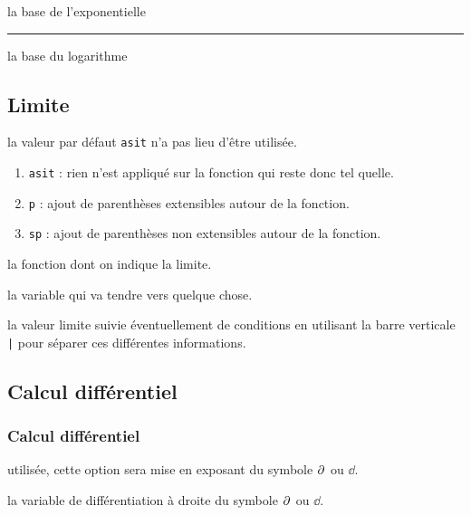 \documentclass[12pt,a4paper]{article}
\theoremstyle{definition}
\newcommand\separation{
	\medskip
	\hfill\rule{0.5\textwidth}{0.75pt}\hfill
	\medskip
}
\begin{document}
\IDarg{} la base de l'exponentielle

\separation


\IDarg{} la base du logarithme



\subsection{Limite}



\IDoption{}  la valeur par défaut \verb+asit+ n'a pas lieu d'être utilisée. 
\begin{enumerate}
	\item \verb+asit+ : rien n'est appliqué sur la fonction qui reste donc tel quelle.
	
	\item \verb+p+ : ajout de parenthèses extensibles autour de la fonction.

	\item \verb+sp+ : ajout de parenthèses non extensibles autour de la fonction.
\end{enumerate}


 la fonction dont on indique la limite.

 la variable qui va tendre vers quelque chose.

 la valeur limite suivie éventuellement de conditions en utilisant la barre verticale \verb+|+ pour séparer ces différentes informations.
\subsection{Calcul différentiel}

\subsubsection{Calcul différentiel}



\IDoption{} utilisée, cette option sera mise en exposant du symbole $\pp{}$ ou $\dd{}$.

\IDarg{} la variable de différentiation à droite du symbole $\pp{}$ ou $\dd{}$.


\end{document}
